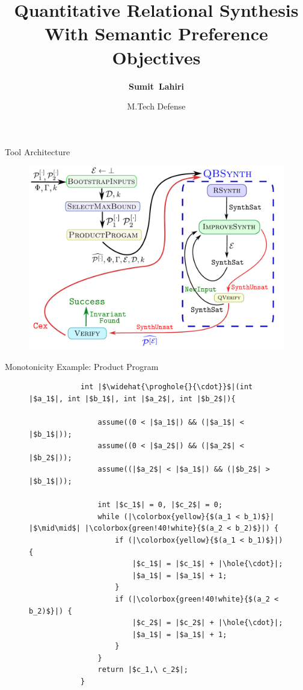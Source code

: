 \documentclass[9pt]{beamer}
\title[M.Tech Defense] %
{Quantitative Relational Synthesis With Semantic Preference Objectives}
\author[Sumit Lahiri] %
{\textbf{Sumit~Lahiri}}
\institute[] %
{
	\large PRAISE Group, CSE Dept. IIT Kanpur
}
\date[02/06/2025] %
{M.Tech Defense}
\newcommand{\hole}[1]{\fbox{\ensuremath{#1}}}
\newcommand{\prog}{\ensuremath{\mathcal{P}}\xspace}
\newcommand{\proghole}[2]{\ensuremath{\prog_{#1}^{[#2]}}}
\begin{document}
\begin{frame}
    \titlepage
\end{frame}







\begin{frame}{Tool Architecture}
    \begin{figure}
        \centering
        \includegraphics[scale=0.45]{assets/tool_arch.pdf}
    \end{figure}
\end{frame}

\begin{frame}[fragile]{Monotonicity Example: Product Program}
    \centering
    \begin{figure}[t]
        \begin{verbatim}
            int |$\widehat{\proghole{}{\cdot}}$|(int |$a_1$|, int |$b_1$|, int |$a_2$|, int |$b_2$|){

                assume((0 < |$a_1$|) && (|$a_1$| < |$b_1$|));
                assume((0 < |$a_2$|) && (|$a_2$| < |$b_2$|));
                assume((|$a_2$| < |$a_1$|) && (|$b_2$| > |$b_1$|));

                int |$c_1$| = 0, |$c_2$| = 0;
                while (|\colorbox{yellow}{$(a_1 < b_1)$}| |$\mid\mid$| |\colorbox{green!40!white}{$(a_2 < b_2)$}|) {
                    if (|\colorbox{yellow}{$(a_1 < b_1)$}|) {
                        |$c_1$| = |$c_1$| + |\hole{\cdot}|;
                        |$a_1$| = |$a_1$| + 1;
                    }
                    if (|\colorbox{green!40!white}{$(a_2 < b_2)$}|) {
                        |$c_2$| = |$c_2$| + |\hole{\cdot}|;
                        |$a_1$| = |$a_1$| + 1;
                    }
                }
                return |$c_1,\ c_2$|;
            }
        \end{verbatim}
    \end{figure}
\end{frame}
\end{document}

